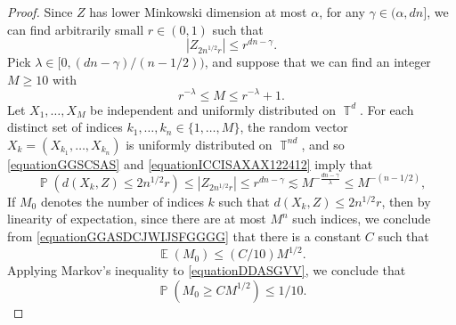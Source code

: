 \documentclass[dvipsnames,letterpaper,12pt]{article}
\numberwithin{equation}{section}
\DeclareMathOperator{\TT}{\mathbb{T}}
\numberwithin{theorem}{section}
\DeclareMathOperator{\EE}{\mathbb{E}}
\DeclareMathOperator{\PP}{\mathbb{P}}
\begin{document}
\begin{proof}
    Since $Z$ has lower Minkowski dimension at most $\alpha$, for any $\gamma \in (\alpha,dn]$, we can find arbitrarily small $r \in (0,1)$ such that
    \begin{equation} \label{equationGGSCSAS}
        |Z_{2 n^{1/2} r}| \leq r^{dn - \gamma}.
    \end{equation}
    Pick $\lambda \in [0,(dn - \gamma)/(n-1/2))$, and suppose that we can find an integer $M \geq 10$ with
    \begin{equation} \label{equationICCISAXAX122412}
        r^{-\lambda} \leq M \leq r^{-\lambda} + 1.
    \end{equation}
    Let $X_1, \dots, X_M$ be independent and uniformly distributed on $\TT^d$. For each distinct set of indices $k_1, \dots, k_n \in \{ 1, \dots, M \}$, the random vector $X_k = (X_{k_1}, \dots, X_{k_n})$ is uniformly distributed on $\TT^{nd}$, and so \eqref{equationGGSCSAS} and \eqref{equationICCISAXAX122412} imply that
    \begin{equation} \label{equationGGASDCJWIJSFGGGG}
        \PP(d(X_k,Z) \leq 2n^{1/2} r) \leq |Z_{2n^{1/2}r}| \leq r^{dn - \gamma} \lesssim M^{- \frac{dn - \gamma}{\lambda}} \leq M^{-(n-1/2)},
    \end{equation}
    If $M_0$ denotes the number of indices $k$ such that $d(X_k,Z) \leq 2n^{1/2}r$, then by linearity of expectation, since there are at most $M^n$ such indices, we conclude from \eqref{equationGGASDCJWIJSFGGGG} that there is a constant $C$ such that
    \begin{equation} \label{equationDDASGVV}
        \EE(M_0) \leq (C/10) M^{1/2}.
    \end{equation}
    Applying Markov's inequality to \eqref{equationDDASGVV}, we conclude that
    \begin{equation} \label{equationFGGGSC}
        \PP(M_0 \geq C M^{1/2}) \leq 1/10.
    \end{equation}

\end{proof}
\end{document}
